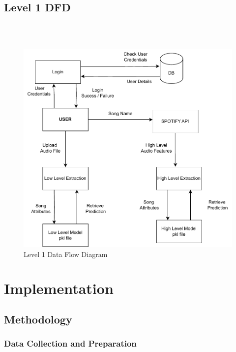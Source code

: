 \documentclass[11pt]{report}
\begin{document}
\clearpage
\section{Level 1 DFD}
\\
\\

\begin{figure}[h]
    \centering
    \includegraphics[width=0.8\linewidth]{PDF/DFD1.pdf}
    \caption{Level 1 Data Flow Diagram}
\end{figure}

\chapter{Implementation}
\section{Methodology}


\subsection{Data Collection and Preparation}
\end{document}
